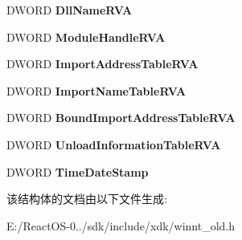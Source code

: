 \begin{DoxyCompactItemize}
\begin{tabbing}
\end{tabbing}\item 
\mbox{\label{struct___i_m_a_g_e___d_e_l_a_y_l_o_a_d___d_e_s_c_r_i_p_t_o_r_a41772447f7cf6e943380a3ab637f04e0}} 
D\+W\+O\+RD {\bfseries Dll\+Name\+R\+VA}
\item 
\mbox{\label{struct___i_m_a_g_e___d_e_l_a_y_l_o_a_d___d_e_s_c_r_i_p_t_o_r_a8f4829cd6c15ffd852eb2b95cec4bae6}} 
D\+W\+O\+RD {\bfseries Module\+Handle\+R\+VA}
\item 
\mbox{\label{struct___i_m_a_g_e___d_e_l_a_y_l_o_a_d___d_e_s_c_r_i_p_t_o_r_a9413645cefe8b211394712da017d804e}} 
D\+W\+O\+RD {\bfseries Import\+Address\+Table\+R\+VA}
\item 
\mbox{\label{struct___i_m_a_g_e___d_e_l_a_y_l_o_a_d___d_e_s_c_r_i_p_t_o_r_a99cbde6c5d2737f60329a78a296eec6a}} 
D\+W\+O\+RD {\bfseries Import\+Name\+Table\+R\+VA}
\item 
\mbox{\label{struct___i_m_a_g_e___d_e_l_a_y_l_o_a_d___d_e_s_c_r_i_p_t_o_r_af50bca6c734b5a94914cca512517f1e8}} 
D\+W\+O\+RD {\bfseries Bound\+Import\+Address\+Table\+R\+VA}
\item 
\mbox{\label{struct___i_m_a_g_e___d_e_l_a_y_l_o_a_d___d_e_s_c_r_i_p_t_o_r_aa3fed6e3b3805d61a29a7613fa8554f2}} 
D\+W\+O\+RD {\bfseries Unload\+Information\+Table\+R\+VA}
\item 
\mbox{\label{struct___i_m_a_g_e___d_e_l_a_y_l_o_a_d___d_e_s_c_r_i_p_t_o_r_a0a5c2ccdce8043d582521f665857ced3}} 
D\+W\+O\+RD {\bfseries Time\+Date\+Stamp}
\end{DoxyCompactItemize}


该结构体的文档由以下文件生成\+:\begin{DoxyCompactItemize}
\item 
E\+:/\+React\+O\+S-\/0../sdk/include/xdk/winnt\+\_\+old.\+h\end{DoxyCompactItemize}
